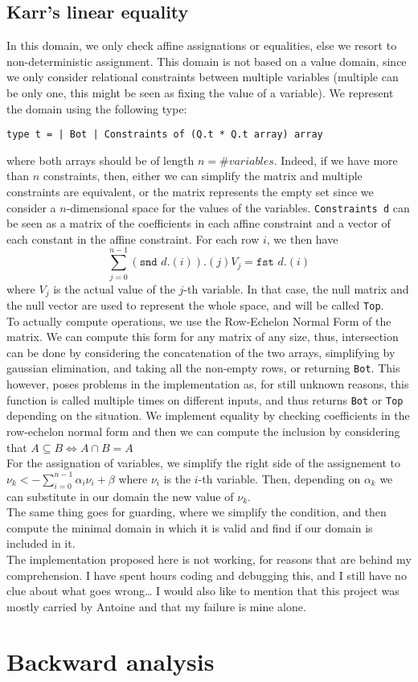 \documentclass[12pt,a4paper]{article}
\begin{document}
\subsection{Karr's linear equality}
In this domain, we only check affine assignations or equalities, else we resort to non-deterministic assignment. This domain is not based on a value domain, since we only consider relational constraints between multiple variables (multiple can be only one, this might be seen as fixing the value of a variable).
We represent the domain using the following type:
\begin{center}
	\texttt{type t = | Bot | Constraints of (Q.t * Q.t array) array}
\end{center}
where both arrays should be of length $n = \# variables$.
Indeed, if we have more than $n$ constraints, then, either we can simplify the matrix and multiple constraints are equivalent, or the matrix represents the empty set since we consider a $n$-dimensional space for the values of the variables.
\texttt{Constraints d} can be seen as a matrix of the coefficients in each affine constraint and a vector of each constant in the affine constraint. For each row $i$, we then have
\[
	\sum_{j = 0}^{n - 1} (\texttt{snd } d.(i)).(j) V_{j} = \texttt{fst } d.(i)
\]
where $V_{j}$ is the actual value of the $j$-th variable.
In that case, the null matrix and the null vector are used to represent the whole space, and will be called \texttt{Top}.\\
To actually compute operations, we use the Row-Echelon Normal Form of the matrix.
We can compute this form for any matrix of any size, thus, intersection can be done by considering the concatenation of the two arrays, simplifying by gaussian elimination, and taking all the non-empty rows, or returning \texttt{Bot}.
This however, poses problems in the implementation as, for still unknown reasons, this function is called multiple times on different inputs, and thus returns \texttt{Bot} or \texttt{Top} depending on the situation.
We implement equality by checking coefficients in the row-echelon normal form and then we can compute the inclusion by considering that $A \subseteq B \Leftrightarrow A \cap B = A$\\
For the assignation of variables, we simplify the right side of the assignement to $\nu_{k} <- \sum_{i = 0}^{n - 1}\alpha_{i}\nu_{i} + \beta$ where $\nu_{i}$ is the $i$-th variable.
Then, depending on $\alpha_{k}$ we can substitute in our domain the new value of $\nu_{k}$.\\
The same thing goes for guarding, where we simplify the condition, and then compute the minimal domain in which it is valid and find if our domain is included in it.\\

The implementation proposed here is not working, for reasons that are behind my comprehension. I have spent hours coding and debugging this, and I still have no clue about what goes wrong\dots
I would also like to mention that this project was mostly carried by Antoine and that my failure is mine alone.

\section{Backward analysis}
\end{document}
